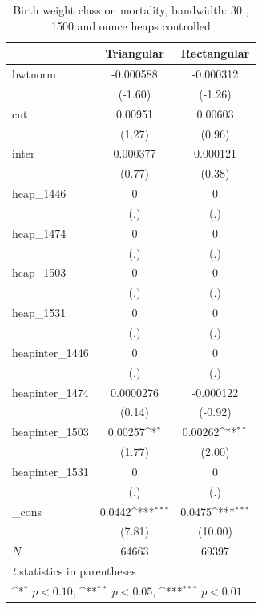 \documentclass[a4paper,11pt]{article}
\begin{document}
\begin{table}[htbp]\centering
\def\sym#1{\ifmmode^{#1}\else\(^{#1}\)\fi}
\caption{Birth weight class on mortality, bandwidth: 30 , 1500 and ounce heaps controlled}
\label{B4.bw30}
\begin{tabular}{l*{2}{c}}
\hline\hline
            &\multicolumn{1}{c}{Triangular}&\multicolumn{1}{c}{Rectangular}\\
\hline
bwtnorm     &   -0.000588         &   -0.000312         \\
            &     (-1.60)         &     (-1.26)         \\
[1em]
cut         &     0.00951         &     0.00603         \\
            &      (1.27)         &      (0.96)         \\
[1em]
inter       &    0.000377         &    0.000121         \\
            &      (0.77)         &      (0.38)         \\
[1em]
heap\_1446   &           0         &           0         \\
            &         (.)         &         (.)         \\
[1em]
heap\_1474   &           0         &           0         \\
            &         (.)         &         (.)         \\
[1em]
heap\_1503   &           0         &           0         \\
            &         (.)         &         (.)         \\
[1em]
heap\_1531   &           0         &           0         \\
            &         (.)         &         (.)         \\
[1em]
heapinter\_1446&           0         &           0         \\
            &         (.)         &         (.)         \\
[1em]
heapinter\_1474&   0.0000276         &   -0.000122         \\
            &      (0.14)         &     (-0.92)         \\
[1em]
heapinter\_1503&     0.00257\sym{*}  &     0.00262\sym{**} \\
            &      (1.77)         &      (2.00)         \\
[1em]
heapinter\_1531&           0         &           0         \\
            &         (.)         &         (.)         \\
[1em]
\_cons      &      0.0442\sym{***}&      0.0475\sym{***}\\
            &      (7.81)         &     (10.00)         \\
\hline
\(N\)       &       64663         &       69397         \\
\hline\hline
\multicolumn{3}{l}{\footnotesize \textit{t} statistics in parentheses}\\
\multicolumn{3}{l}{\footnotesize \sym{*} \(p<0.10\), \sym{**} \(p<0.05\), \sym{***} \(p<0.01\)}\\
\end{tabular}
\end{table}
\end{document}
